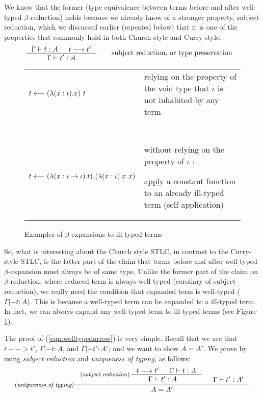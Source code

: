 We know that the former (type equivalence between terms before and after
well-typed $\beta$-reduction) holds because we already know of
a stronger property, subject reduction, which we discussed earlier
(repeated below) that it is one of the properties that commonly hold
in both Church style and Curry style.
\begin{align*}
\inference{\Gamma |- t : A  & t --> t'}{\Gamma |- t' : A}
 &\qquad \text{subject reduction, or type preservation}
\end{align*}

\begin{figure}
\begin{singlespace}
\begin{tabular}{lp{7cm}}
$t <-- (\lambda(x:\iota).x)~t$ &
relying on the property of the void type
that $\iota$ is not inhabited by any term
\\ ~ \\
$t <-- (\lambda(x:\iota -> \iota).t)~(\lambda(x:\iota).x~x)$ &
without relying on the property of $\iota$ : \par
apply a constant function to an already ill-typed term (self application)
\end{tabular}
\end{singlespace}
\caption{Examples of $\beta$-expansions to ill-typed terms}
\label{ill-typed_expand}
\end{figure}

So, what is interesting about the Church style STLC, in contrast to
the Curry-style STLC, is the latter part of the claim that terms before and
after well-typed $\beta$-expansion must always be of same type. Unlike
the former part of the claim on $\beta$-reduction, where reduced term
is always well-typed (corollary of subject reduction), we really need
the condition that expanded term is well-typed ($\Gamma |- t : A$).
This is because a well-typed term can be expanded to a ill-typed term.
In fact, we can always expand any well-typed term to ill-typed terms
(see Figure \ref{ill-typed_expand}).

The proof of (\ref{eqn:welltypedarrow}) is very simple.
Recall that we are that $t --> t'$, $\Gamma |- t : A$,
and $\Gamma |- t' : A'$; and we want to show $A = A'$.
We prove by using \emph{subject reduction} and \emph{uniqueness of typing},
as follows:
\[ \inference[(\emph{uniqueness of typing})]
	{ \inference[(\emph{subject reduction})\!\!\!]
		{t --> t' & \Gamma |- t : A}
		{\Gamma |- t' : A \phantom{a_f}} 
	& \Gamma |- t' : A' }
	{ A = A' }
\]

